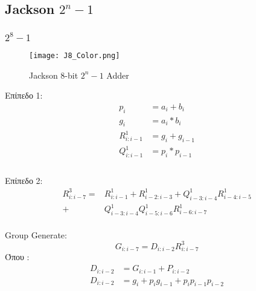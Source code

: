 \subsection{Jackson $2^n-1$}


\subsubsection{$2^8-1$}

\begin{figure}[ht]
\centering
\texttt{[image: J8\_Color.png]}
\caption{Jackson 8-bit $2^n-1$ Adder}
\label{HASchematic}
\end{figure}

Επίπεδο 1:\\
\begin{equation}
\begin{split}
p_i &= a_i + b_i\\
g_i &= a_i * b_i\\
R^1_{i:i-1} &= g_i + g_{i-1}\\
Q^1_{i:i-1} &= p_i * p_{i-1}\\
\end{split}
\end{equation}
\\
Επίπεδο 2:\\
\begin{equation}
\begin{split}
R^3_{i:i-7} =& R^1_{i:i-1} + R^1_{i-2:i-3} + Q^1_{i-3:i-4} R^1_{i-4:i-5} \\
            +& Q^1_{i-3:i-4} Q^1_{i-5:i-6} R^1_{i-6:i-7} 
\end{split}
\end{equation}
\\
Group Generate:\\
\begin{equation}
G_{i:i-7} = D_{i:i-2} R^3_{i:i-7}
\end{equation}
Όπου : 
\begin{equation}
\begin{split}
D_{i:i-2} &= G_{i:i-1} + P_{i:i-2}\\
D_{i:i-2} &= g_i + p_ig_{i-1} + p_ip_{i-1}p_{i-2}
\end{split}
\end{equation}

